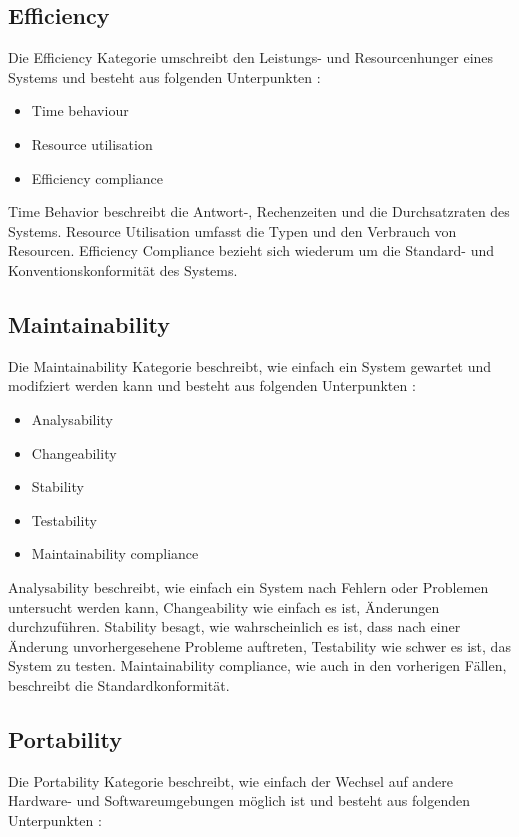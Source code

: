 \subsection{Efficiency}
Die Efficiency Kategorie umschreibt den Leistungs- und Resourcenhunger eines Systems und besteht aus folgenden Unterpunkten \cite[S. 7]{ISO_SQ}:

\begin{itemize}
  \item \glqq Time behaviour\grqq
  \item \glqq Resource utilisation\grqq
  \item \glqq Efficiency compliance\grqq
\end{itemize}

Time Behavior beschreibt die Antwort-, Rechenzeiten und die Durchsatzraten des Systems. Resource Utilisation umfasst die Typen und den Verbrauch von Resourcen. Efficiency Compliance bezieht sich wiederum um die Standard- und Konventionskonformität des Systems. \cite[S. 10]{ISO_SQ}

\subsection{Maintainability}
Die Maintainability Kategorie beschreibt, wie einfach ein System gewartet und modifziert werden kann und besteht aus folgenden Unterpunkten \cite[S. 7]{ISO_SQ}:

\begin{itemize}
  \item \glqq Analysability\grqq
  \item \glqq Changeability\grqq
  \item \glqq Stability\grqq
  \item \glqq Testability\grqq
  \item \glqq Maintainability compliance\grqq
\end{itemize}

Analysability beschreibt, wie einfach ein System nach Fehlern oder Problemen untersucht werden kann, Changeability wie einfach es ist, Änderungen durchzuführen. Stability besagt, wie wahrscheinlich es ist, dass nach einer Änderung unvorhergesehene Probleme auftreten, Testability wie schwer es ist, das System zu testen. Maintainability compliance, wie auch in den vorherigen Fällen, beschreibt die Standardkonformität. \cite[S. 10-11]{ISO_SQ}


\subsection{Portability}
Die Portability Kategorie beschreibt, wie einfach der Wechsel auf andere Hardware- und Softwareumgebungen möglich ist und besteht aus folgenden Unterpunkten \cite[S. 7]{ISO_SQ}:

